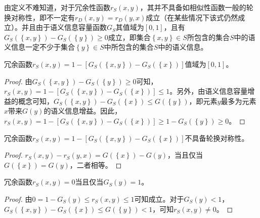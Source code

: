 \documentclass{../notes}
\begin{document}
    由定义不难知道，对于冗余性函数$r_S(x,y)$，其并不具备如相似性函数一般的轮换对称性，即不一定有$r_D\left(x,y\right)=r_D(y,x)$成立（在某些情况下该式仍然成立）。并且由于语义信息容量函数$G_S$其值域为$[0,1]$，且有$G_S\left(\left\{x,y\right\}\right)-G_S\left(\left\{y\right\}\right)\geq0$成立，即集合$\left\{x,y\right\}\in S$所包含的集合$S$中的语义信息一定不少于集合$\left\{y\right\}\in S$中所包含的集合$S$中的语义信息。

    \begin{proposition}
        冗余函数$r_S\left(x,y\right)=1-[G_S(\left\{x,y\right\})-G_S\left(\left\{x\right\}\right)]$值域为$\left[0,1\right]$。
    \end{proposition}

    \begin{proof}
        由$G_S\left(\left\{x,y\right\}\right)-G_S\left(\left\{y\right\}\right)\geq0$可知，$r_S\left(x,y\right)=1-\left[G_S\left(\left\{x,y\right\}\right)-G_S\left(\left\{x\right\}\right)\right]\le1$。另外，由语义信息容量增益的概念可知，$G_S\left(\left\{x,y\right\}\right)-G_S\left(\left\{x\right\}\right)\le G\left(\left\{y\right\}\right)$，即元素$y$最多为元素$x$带来$G({y})$的语义信息增益。因此，$r_S\left(x,y\right)=1-\left[G_S\left(\left\{x,y\right\}\right)-G_S\left(\left\{x\right\}\right)\right]\geq1-G_S\left(\left\{y\right\}\right)\geq0$。
    \end{proof}

    \begin{proposition}
        冗余函数$r_S\left(x,y\right)=1-[G_S(\left\{x,y\right\})-G_S\left(\left\{x\right\}\right)]$不具备轮换对称性。
    \end{proposition}

    \begin{proof}
        $r_S\left(x,y\right)-r_S\left(y,x\right)=G\left(\left\{x\right\}\right)-G({y})$，当且仅当$G\left(\left\{x\right\}\right)=G({y})$，二者相等。
    \end{proof}

    \begin{proposition}
        冗余函数$r_S\left(x,y\right)=0$当且仅当$G_S\left({y}\right)=1$。
    \end{proposition}

    \begin{proof}
        由$0=1-G_S({y})\le r_S\left(x,y\right)\le1$可知成立。对于$G_S\left({y}\right)<1$，$G_S\left(\left\{x,y\right\}\right)-G_S\left(\left\{x\right\}\right)\le G\left(\left\{y\right\}\right)<1$，可知$r_S\left(x,y\right)\neq0$。
    \end{proof}
\end{document}
